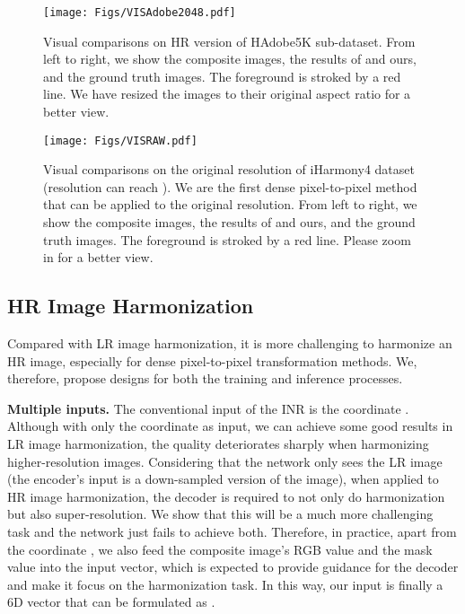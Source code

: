 \documentclass[10pt,journal,twocolumn,twoside]{IEEEtran}
\begin{document}
\begin{figure*}[!ht]
 \centering
   \begin{minipage}[t]{0.44\linewidth}
  \centering
   \texttt{[image: Figs/VISAdobe2048.pdf]}
   \caption{Visual comparisons on  HR version of HAdobe5K sub-dataset. From left to right, we show the composite images, the results of \cite{cong2022high} and ours, and the ground truth images. The foreground is stroked by a red line. We have resized the images to their original aspect ratio for a better view.}
   \label{fig:VISAdobe2048}
\end{minipage}
\hspace{1em}
 \begin{minipage}[t]{0.51\linewidth}
  \centering
   \texttt{[image: Figs/VISRAW.pdf]}
   \caption{Visual comparisons on the original resolution of iHarmony4 dataset (resolution can reach ). We are the first dense pixel-to-pixel method that can be applied to the original resolution. From left to right, we show the composite images, the results of \cite{ke2022harmonizer, xue2022dccf} and ours, and the ground truth images. The foreground is stroked by a red line. Please zoom in for a better view.}
   \label{fig:VISRAW}
   \end{minipage}
\end{figure*}


\subsection{HR Image Harmonization}
\label{subsec:specific}

Compared with LR image harmonization, it is more challenging to harmonize an HR image, especially for dense pixel-to-pixel transformation methods. We, therefore, propose designs for both the training and inference processes.

\textbf{Multiple inputs.} The conventional input of the INR is the coordinate  \cite{tancik2020fourier, sitzmann2020implicit, skorokhodov2021adversarial, anokhin2021image}. Although with only the coordinate as input, we can achieve some good results in LR image harmonization, the quality deteriorates sharply when harmonizing higher-resolution images. Considering that the network only sees the LR image (the encoder's input is a down-sampled version of the image), when applied to HR image harmonization, the decoder is required to not only do harmonization but also super-resolution. We show that this will be a much more challenging task and the network just fails to achieve both. Therefore, in practice, apart from the coordinate , we also feed the composite image's RGB value  and the mask value  into the input vector, which is expected to provide guidance for the decoder and make it focus on the harmonization task. In this way, our input is finally a 6D vector that can be formulated as .
\end{document}
